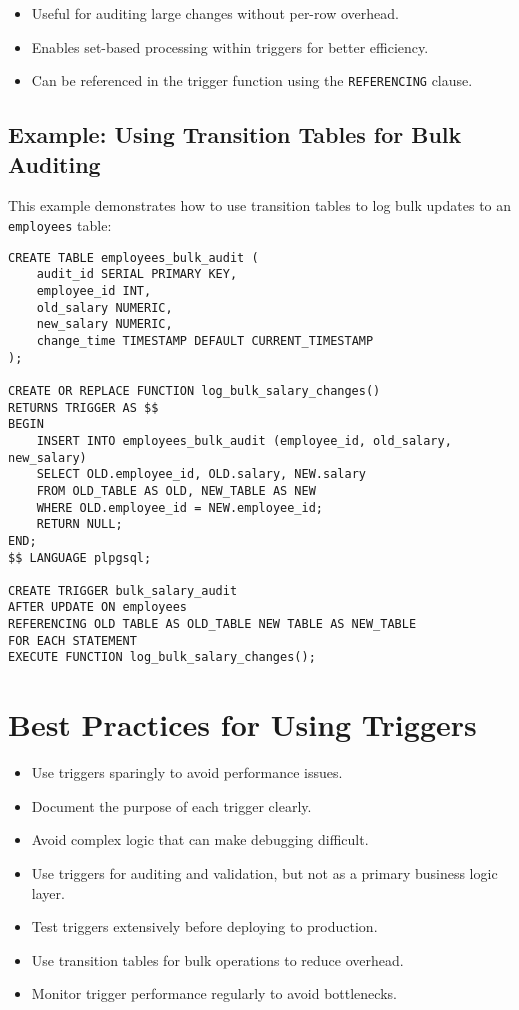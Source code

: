 \documentclass{article}
\begin{document}
\begin{itemize}
    \item Useful for auditing large changes without per-row overhead.
    \item Enables set-based processing within triggers for better efficiency.
    \item Can be referenced in the trigger function using the \texttt{REFERENCING} clause.
\end{itemize}

\subsection*{Example: Using Transition Tables for Bulk Auditing}

This example demonstrates how to use transition tables to log bulk updates to an \texttt{employees} table:

\begin{verbatim}
CREATE TABLE employees_bulk_audit (
    audit_id SERIAL PRIMARY KEY,
    employee_id INT,
    old_salary NUMERIC,
    new_salary NUMERIC,
    change_time TIMESTAMP DEFAULT CURRENT_TIMESTAMP
);

CREATE OR REPLACE FUNCTION log_bulk_salary_changes()
RETURNS TRIGGER AS $$
BEGIN
    INSERT INTO employees_bulk_audit (employee_id, old_salary, new_salary)
    SELECT OLD.employee_id, OLD.salary, NEW.salary
    FROM OLD_TABLE AS OLD, NEW_TABLE AS NEW
    WHERE OLD.employee_id = NEW.employee_id;
    RETURN NULL;
END;
$$ LANGUAGE plpgsql;

CREATE TRIGGER bulk_salary_audit
AFTER UPDATE ON employees
REFERENCING OLD TABLE AS OLD_TABLE NEW TABLE AS NEW_TABLE
FOR EACH STATEMENT
EXECUTE FUNCTION log_bulk_salary_changes();
\end{verbatim}

\section{Best Practices for Using Triggers}
\begin{itemize}
    \item Use triggers sparingly to avoid performance issues.
    \item Document the purpose of each trigger clearly.
    \item Avoid complex logic that can make debugging difficult.
    \item Use triggers for auditing and validation, but not as a primary business logic layer.
    \item Test triggers extensively before deploying to production.
    \item Use transition tables for bulk operations to reduce overhead.
    \item Monitor trigger performance regularly to avoid bottlenecks.
\end{itemize}
\end{document}
